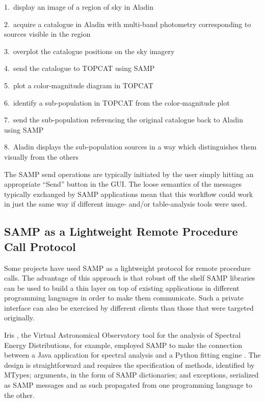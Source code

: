 1.\ display an image of a region of sky in Aladin 

2.\ acquire a catalogue in Aladin with multi-band photometry corresponding to sources visible in the region

3.\ overplot the catalogue positions on the sky imagery

4.\ send the catalogue to TOPCAT using SAMP

5.\ plot a color-magnitude diagram in TOPCAT

6.\ identify a sub-population in TOPCAT from the color-magnitude plot

7.\ send the sub-population referencing the original catalogue back to Aladin using SAMP

8.\ Aladin displays the sub-population sources in a way which distinguishes them visually from the others

The SAMP send operations are typically initiated by the user simply hitting an appropriate ``Send'' button in the GUI. The loose semantics of the messages typically exchanged by SAMP applications mean that this workflow could work in just the same way if different image- and/or table-analysis tools were used.

\subsection{SAMP as a Lightweight Remote Procedure Call Protocol}

Some projects have used SAMP as a lightweight protocol for remote procedure calls. The advantage of this approach is that robust off the shelf SAMP libraries can be used to build a thin layer on top of existing applications in different programming languages in order to make them communicate. Such a private interface can also be exercised by different clients than those that were targeted originally.

Iris \citep{2012ASPC..461..893D}, the Virtual Astronomical Observatory tool for the analysis of Spectral Energy Distributions, for example, employed SAMP to make the connection between a Java application for spectral analysis \citep[Specview, by STScI,][]{2000ASPC..216...79B} and a Python fitting engine \citep[Sherpa, by SAO,][]{2007ASPC..376..543D}. The design is straightforward and requires the specification of methods, identified by MTypes; arguments, in the form of SAMP dictionaries; and exceptions, serialized as SAMP messages and as such propagated from one programming language to the other.

